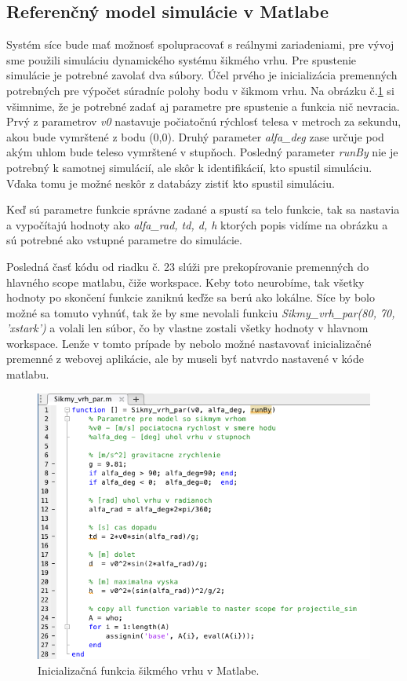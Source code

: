 \subsection{Referenčný model simulácie v Matlabe}
Systém síce bude mať možnosť spolupracovať s reálnymi zariadeniami, pre vývoj sme použili simuláciu dynamického systému šikmého vrhu. Pre spustenie simulácie je potrebné zavolať dva súbory. Účel prvého je inicializácia premenných potrebných pre výpočet súradníc polohy bodu v šikmom vrhu. Na obrázku č.\ref{img-matlab-function} si všimnime, že je potrebné zadať aj parametre pre spustenie a funkcia nič nevracia. Prvý z parametrov \textit{v0} nastavuje počiatočnú rýchlosť telesa v metroch za sekundu, akou bude vymrštené z bodu (0,0). Druhý parameter \textit{alfa\_deg} zase určuje pod akým uhlom bude teleso vymrštené v stupňoch. Posledný parameter \textit{runBy} nie je potrebný k samotnej simulácií, ale skôr k identifikácií, kto spustil simuláciu. Vďaka tomu je možné neskôr z databázy zistiť kto spustil simuláciu.

Keď sú parametre funkcie správne zadané a spustí sa telo funkcie, tak sa nastavia a vypočítajú hodnoty ako \textit{alfa\_rad, td, d, h} ktorých popis vidíme na obrázku a sú potrebné ako vstupné parametre do simulácie.

Posledná časť kódu od riadku č. 23 slúži pre prekopírovanie premenných do hlavného scope matlabu, čiže workspace. Keby toto neurobíme, tak všetky hodnoty po skončení funkcie zaniknú keďže sa berú ako lokálne. Síce by bolo možné sa tomuto vyhnúť, tak že by sme nevolali funkciu \textit{Sikmy\_vrh\_par(80, 70, 'xstark')} a volali len súbor, čo by vlastne zostali všetky hodnoty v hlavnom workspace. Lenže v tomto prípade by nebolo možné nastavovať inicializačné premenné z webovej aplikácie, ale by museli byť natvrdo nastavené v kóde matlabu.

\begin{figure}[H]
  \centering
  \includegraphics[scale=0.7]{img/code/matlab-function.png}
  \caption{Inicializačná funkcia šikmého vrhu v Matlabe.}
  \label{img-matlab-function}
\end{figure}

